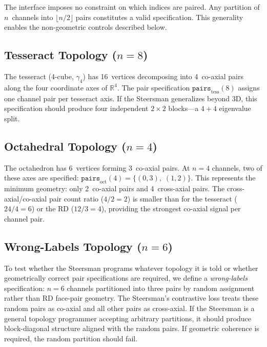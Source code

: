 The interface imposes no constraint on which indices are paired.
Any partition of $n$~channels into $\lfloor n/2 \rfloor$ pairs
constitutes a valid specification. This generality enables the
non-geometric controls described below.

\subsection{Tesseract Topology ($n = 8$)}
\label{sec:tesseract_method}

The tesseract (4-cube, $\gamma_4$) has 16~vertices decomposing
into 4~co-axial pairs along the four coordinate axes of
$\mathbb{R}^4$. The pair specification
$\texttt{pairs}_{\text{tess}}(8)$ assigns one channel pair per
tesseract axis. If the Steersman generalizes beyond 3D, this
specification should produce four independent $2 \times 2$
blocks---a $4{+}4$ eigenvalue split.

\subsection{Octahedral Topology ($n = 4$)}
\label{sec:octahedral_method}

The octahedron has 6~vertices forming 3~co-axial pairs. At $n = 4$
channels, two of these axes are specified:
$\texttt{pairs}_{\text{oct}}(4) = \{(0,3),\; (1,2)\}$.
This represents the minimum geometry: only 2~co-axial pairs and
4~cross-axial pairs. The cross-axial/co-axial pair count ratio
($4/2 = 2$) is smaller than for the tesseract ($24/4 = 6$) or the
RD ($12/3 = 4$), providing the strongest co-axial signal per
channel pair.

\subsection{Wrong-Labels Topology ($n = 6$)}
\label{sec:wrong_labels_method}

To test whether the Steersman programs whatever topology it is told
or whether geometrically correct pair specifications are required,
we define a \emph{wrong-labels} specification: $n = 6$ channels
partitioned into three pairs by random assignment rather than RD
face-pair geometry. The Steersman's contrastive loss treats these
random pairs as co-axial and all other pairs as cross-axial. If the
Steersman is a general topology programmer accepting arbitrary
partitions, it should produce block-diagonal structure aligned with
the random pairs. If geometric coherence is required, the random
partition should fail.

